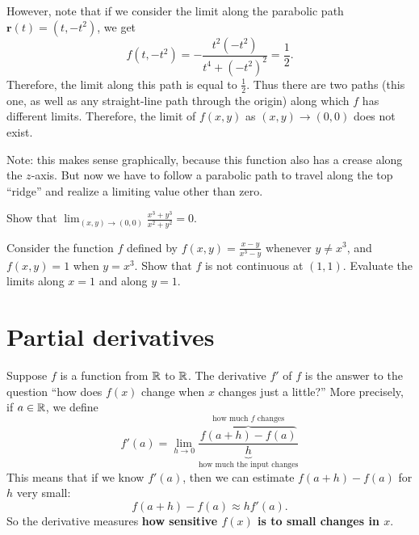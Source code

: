 \documentclass[prettycode,shellescape]{watsonbook}
\begin{document}
\begin{solution}
  However, note that if we consider the limit along the parabolic
  path $\mathbf{r}(t) = (t, -t^2)$, we get
  \[
    f(t,-t^2) = -\frac{t^2(-t^2)}{t^4+(-t^2)^2} = \frac{1}{2}. 
  \]
  Therefore, the limit along this path is equal to
  $\tfrac{1}{2}$. Thus there are two paths (this one, as well as any
  straight-line path through the origin) along which $f$ has different
  limits. Therefore, the limit of $f(x,y)$ as $(x,y) \to (0,0)$ does
  not exist.
  
  Note: this makes sense graphically, because this function also has a
  crease along the $z$-axis. But now we have to follow a parabolic
  path to travel along the top ``ridge'' and realize a limiting value
  other than zero.
\end{solution}


\begin{exercise}{}{}
  Show that $\displaystyle{\lim_{(x,y) \to (0,0)} \frac{x^3 + y^3}{x^2 + y^2}} =
  0$. 
\end{exercise}

\begin{exercise}{}{}
  Consider the function $f$ defined by $f(x,y) = \frac{x-y}{x^3-y}$
  whenever $y \neq x^3$, and $f(x,y) = 1$ when $y = x^3$. Show that
  $f$ is not continuous at $(1,1)$. Evaluate the limits along 
  $x=1$ and along $y=1$.
\end{exercise}

\section{Partial derivatives} \label{sec:partial}



Suppose $f$ is a function from $\mathbb{R}$ to $\mathbb{R}$. The derivative $f'$ of
$f$ is the answer to the question ``how does $f(x)$ change when $x$
changes just a little?'' More precisely, if $a\in \mathbb{R}$, we define
\[
  f'(a) = \lim_{h \to 0} \frac{\overbrace{f(a+h)-f(a)}^{\text{how
        much $f$ changes}}}{\underbrace{h}_{\text{how much the input
        changes}}}
\]
This means that if we know $f'(a)$, then we can estimate
$f(a+h) - f(a)$ for $h$ very small:
\[
  f(a+h) - f(a) \approx h
  f'(a). 
\]
So the derivative measures \textbf{how sensitive $f(x)$ is to small
  changes in $x$}.
\end{document}
